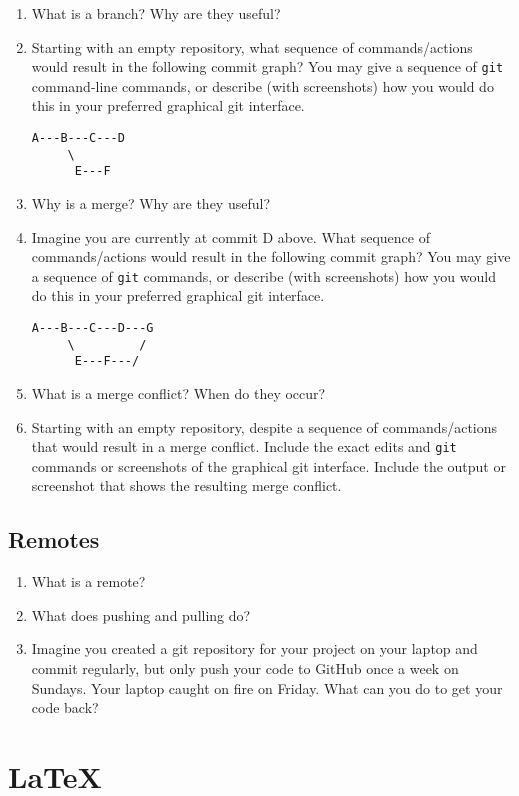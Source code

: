 \documentclass[10pt,twocolumn]{article}
\begin{document}
\begin{enumerate}
\item What is a branch? Why are they useful?
\item Starting with an empty repository, what sequence of commands/actions would result in the following commit graph? You may give a sequence of \texttt{git} command-line commands, or describe (with screenshots) how you would do this in your preferred graphical git interface.
\begin{verbatim}
A---B---C---D
     \
      E---F
\end{verbatim}
\item Why is a merge? Why are they useful?
\item Imagine you are currently at commit D above. What sequence of commands/actions would result in the following commit graph? You may give a sequence of \texttt{git} commands, or describe (with screenshots) how you would do this in your preferred graphical git interface.
\begin{verbatim}
A---B---C---D---G
     \         /
      E---F---/
\end{verbatim}
\item What is a merge conflict? When do they occur?
\item Starting with an empty repository, despite a sequence of commands/actions that would result in a merge conflict. Include the exact edits and \texttt{git} commands or screenshots of the graphical git interface. Include the output or screenshot that shows the resulting merge conflict.
\end{enumerate}

\subsection{Remotes}

\begin{enumerate}
\item What is a remote?
\item What does pushing and pulling do?
\item Imagine you created a git repository for your project on your laptop and commit regularly, but only push your code to GitHub once a week on Sundays. Your laptop caught on fire on Friday. What can you do to get your code back?
\end{enumerate}

\section{\LaTeX}
\end{document}
